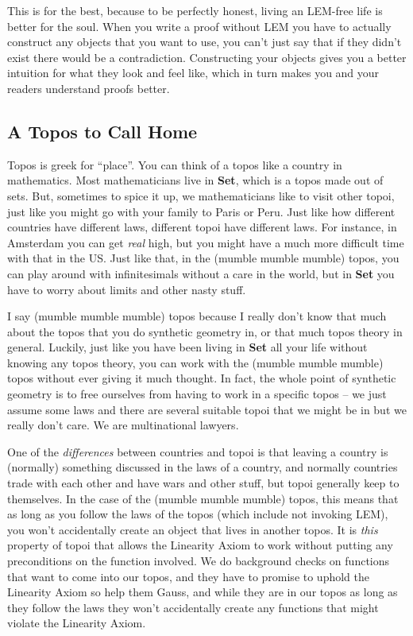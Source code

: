 \documentclass[]{book}
\begin{document}
This is for the best, because to be perfectly honest, living an LEM-free life is better for the soul. When you write a proof without LEM you have to actually construct any objects that you want to use, you can't just say that if they didn't exist there would be a contradiction.  Constructing your objects gives you a better intuition for what they look and feel like, which in turn makes you and your readers understand proofs better.

\subsection{A Topos to Call Home}

Topos is greek for ``place''. You can think of a topos like a country in mathematics. Most mathematicians live in \textbf{Set}, which is a topos made out of sets. But, sometimes to spice it up, we mathematicians like to visit other topoi, just like you might go with your family to Paris or Peru. Just like how different countries have different laws, different topoi have different laws. For instance, in Amsterdam you can get \emph{real} high, but you might have a much more difficult time with that in the US. Just like that, in the (mumble mumble mumble) topos, you can play around with infinitesimals without a care in the world, but in \textbf{Set} you have to worry about limits and other nasty stuff.

I say (mumble mumble mumble) topos because I really don't know that much about the topos that you do synthetic geometry in, or that much topos theory in general. Luckily, just like you have been living in \textbf{Set} all your life without knowing any topos theory, you can work with the (mumble mumble mumble) topos without ever giving it much thought. In fact, the whole point of synthetic geometry is to free ourselves from having to work in a specific topos -- we just assume some laws and there are several suitable topoi that we might be in but we really don't care. We are multinational lawyers.

One of the \emph{differences} between countries and topoi is that leaving a country is (normally) something discussed in the laws of a country, and normally countries trade with each other and have wars and other stuff, but topoi generally keep to themselves. In the case of the (mumble mumble mumble) topos, this means that as long as you follow the laws of the topos (which include not invoking LEM), you won't accidentally create an object that lives in another topos. It is \emph{this} property of topoi that allows the Linearity Axiom to work without putting any preconditions on the function involved. We do background checks on functions that want to come into our topos, and they have to promise to uphold the Linearity Axiom so help them Gauss, and while they are in our topos as long as they follow the laws they won't accidentally create any functions that might violate the Linearity Axiom.
\end{document}
